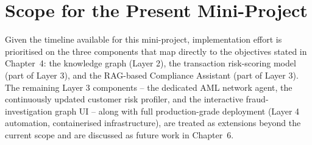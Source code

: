 \section{Scope for the Present Mini-Project}

Given the timeline available for this mini-project, implementation effort is prioritised on the three components that map directly to the objectives stated in Chapter~4: the knowledge graph (Layer 2), the transaction risk-scoring model (part of Layer 3), and the RAG-based Compliance Assistant (part of Layer 3). The remaining Layer 3 components -- the dedicated AML network agent, the continuously updated customer risk profiler, and the interactive fraud-investigation graph UI -- along with full production-grade deployment (Layer 4 automation, containerised infrastructure), are treated as extensions beyond the current scope and are discussed as future work in Chapter~6.
